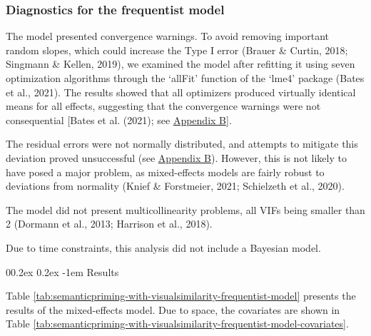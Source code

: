 \documentclass[
  12pt,
  man,floatsintext]{apa7}
\makeatletter
\let\oldparagraph\paragraph
\renewcommand{\paragraph}[1]{\oldparagraph{#1}\mbox{}}
\renewcommand{\paragraph}{\@startsection{paragraph}{4}{\parindent}%
  {0\baselineskip \@plus 0.2ex \@minus 0.2ex}%
  {-1em}%
  {\normalfont\normalsize\bfseries\itshape\typesectitle}}
\makeatother
\begin{document}
\hypertarget{diagnostics-for-the-frequentist-model-1}{%
\subsubsection{Diagnostics for the frequentist model}\label{diagnostics-for-the-frequentist-model-1}}

The model presented convergence warnings. To avoid removing important random slopes, which could increase the Type I error (Brauer \& Curtin, 2018; Singmann \& Kellen, 2019), we examined the model after refitting it using seven optimization algorithms through the `allFit' function of the `lme4' package (Bates et al., 2021). The results showed that all optimizers produced virtually identical means for all effects, suggesting that the convergence warnings were not consequential {[}Bates et al. (2021); see \protect\hyperlink{appendix-B-frequentist-analysis-diagnostics}{\underline{Appendix B}}{]}.

The residual errors were not normally distributed, and attempts to mitigate this deviation proved unsuccessful (see \protect\hyperlink{appendix-B-frequentist-analysis-diagnostics}{\underline{Appendix B}}). However, this is not likely to have posed a major problem, as mixed-effects models are fairly robust to deviations from normality (Knief \& Forstmeier, 2021; Schielzeth et al., 2020).

The model did not present multicollinearity problems, all VIFs being smaller than 2 (Dormann et al., 2013; Harrison et al., 2018).

Due to time constraints, this analysis did not include a Bayesian model.

\hypertarget{results}{%
\paragraph{Results}\label{results}}

Table \ref{tab:semanticpriming-with-visualsimilarity-frequentist-model} presents the results of the mixed-effects model. Due to space, the covariates are shown in Table \ref{tab:semanticpriming-with-visualsimilarity-frequentist-model-covariates}.
\end{document}
